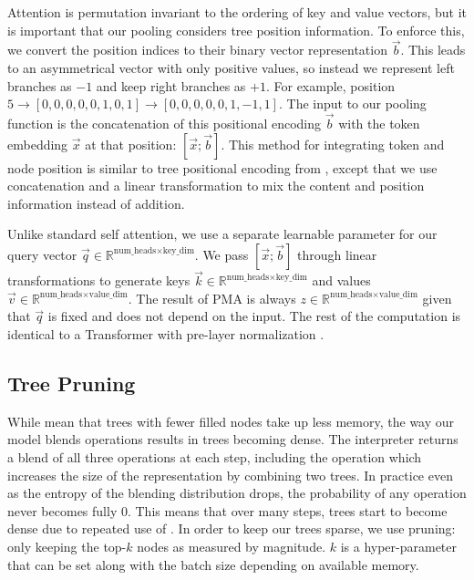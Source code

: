 Attention is permutation invariant to the ordering of key and value vectors, but it is important that our pooling considers tree position information. To enforce this, we convert the position indices to their binary vector representation $\vec{b}$. This leads to an asymmetrical vector with only positive values, so instead we represent left branches as $-1$ and keep right branches as $+1$. For example, position $5 \rightarrow [0,0,0,0,0,1,0,1] \rightarrow [0,0,0,0,0,1,-1,1]$. The input to our pooling function is the concatenation of this positional encoding $\vec{b}$ with the token embedding $\vec{x}$ at that position: $[\vec{x};\vec{b}]$. This method for integrating token and node position is similar to tree positional encoding from \citet{shiv_novel_2019}, except that we use concatenation and a linear transformation to mix the content and position information instead of addition.

Unlike standard self attention, we use a separate learnable parameter for our query vector $\vec{q} \in \mathbb{R}^{\text{num\_heads}\times\text{key\_dim}}$. We pass $[\vec{x};\vec{b}]$ through linear transformations to generate keys $\vec{k} \in \mathbb{R}^{\text{num\_heads}\times\text{key\_dim}}$ and values $\vec{v} \in \mathbb{R}^{\text{num\_heads}\times\text{value\_dim}}$. The result of PMA is always $z \in \mathbb{R}^{\text{num\_heads}\times\text{value\_dim}}$ given that $\vec{q}$ is fixed and does not depend on the input. The rest of the computation is identical to a Transformer with pre-layer normalization \citep{xiong2020layer}.

\subsection{Tree Pruning} \label{sec:sdtm-pruning}
While \fullrepname mean that trees with fewer filled nodes take up less memory, the way our model blends operations results in trees becoming dense.
The interpreter returns a blend of all three operations at each step, including the \cons operation which increases the size of the representation by combining two trees. In practice even as the entropy of the blending distribution drops, the probability of any operation never becomes fully 0. This means that over many steps, trees start to become dense due to repeated use of \cons. In order to keep our trees sparse, we use pruning: only keeping the top-$k$ nodes as measured by magnitude. $k$ is a hyper-parameter that can be set along with the batch size depending on available memory. 

